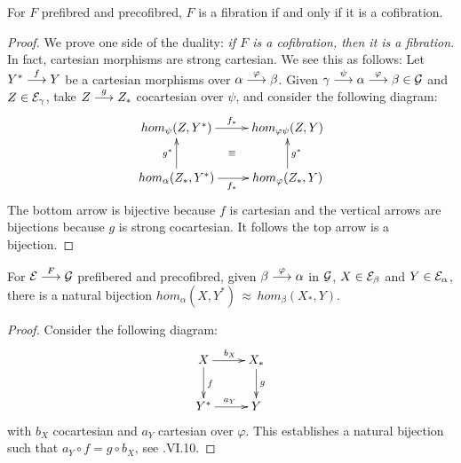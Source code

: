 \begin{proposition} \label{fib<=>cof}
For $F$ prefibred and precofibred, $F$ is a fibration if and only if it is a cofibration.
\end{proposition}
\begin{proof}
We prove one side of the duality: \emph{if $F$ is a cofibration, then it is a fibration.} In fact, cartesian morphisms are strong cartesian. We see this as follows:
Let $Y^* \overset {f} {\longrightarrow} Y$ be a cartesian morphisms over ${\alpha \overset {\varphi} {\longrightarrow} \beta}$. Given ${\gamma \overset {\psi} {\longrightarrow} \alpha \overset {\varphi} {\longrightarrow} \beta \in \mathcal{G}}$ and $Z \in \mathcal{E}_\gamma$, take $Z \overset {g} {\longrightarrow} Z_*$ cocartesian over $\psi$, and consider the following diagram: 
$$
\xymatrix{{hom_{\psi}(Z,Y^*)} \ar[r]^{f_*} \ar@{}[dr]|\equiv & {hom_{\varphi \psi}(Z,Y)} 
\\
		  {hom_\alpha(Z_*,Y^*)} \ar[r]_{f_*} \ar[u]^{g^*} & {hom_{\varphi}(Z_*,Y)} \ar[u]_{g^*}	}	  
$$
The bottom arrow is bijective because $f$ is cartesian and the vertical arrows are bijections because $g$ is strong cocartesian. It follows the top arrow is a bijection.
\end{proof}
\begin{proposition}\label{adjoints}
For  $\mathcal{E} \overset {F} {\longrightarrow} \mathcal{G}$ prefibered and precofibred, given $\beta \overset {\varphi} {\longrightarrow} \alpha$ in $\mathcal{G}$,  
$X \in \mathcal{E}_\beta$ and  $Y \in \mathcal{E}_\alpha$, there is a natural bijection  $hom_\alpha(X,Y^*) \, \approx \, hom_\beta(X_*, Y)$.
\end{proposition}
\begin{proof}
Consider the following diagram:
$$
\xymatrix
    {
     X \ar[r]^{b_X} \ar[d]^{f} & X_* \ar[d]^{g} 
   \\
     Y^* \ar[r]^{a_Y} & Y
    }
$$ 
with $b_X$ cocartesian and $a_Y$ cartesian over $\varphi$. This establishes a natural bijection such that 
$a_Y \circ f = g \circ b_X$, see \cite{sga1}.VI.10.   
\end{proof} 

\vspace{2ex}

